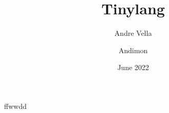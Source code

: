 \documentclass{myclass}
\title{Tinylang}
\author{Andre Vella}
\date{June 2022}
\author{Andimon}   %
\begin{document}
\newpage
\maketitle
\tableofcontents

ffwwdd





\end{document}
